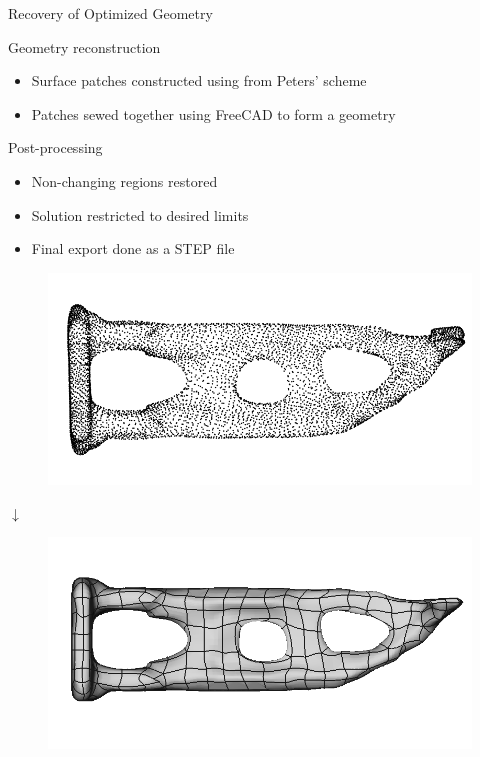 \begin{frame}{Recovery of Optimized Geometry}
	\begin{minipage}[t]{0.5\linewidth}
		\begin{block}{Geometry reconstruction}
			\begin{itemize}
				\item Surface patches constructed using from Peters' scheme \\
				\item Patches sewed together using FreeCAD to form a geometry \\
			\end{itemize}
		\end{block}
		\begin{block}{Post-processing}
			\begin{itemize}
				\item Non-changing regions restored \\
				\item Solution restricted to desired limits \\
				\item Final export done as a STEP file
			\end{itemize}
		\end{block}
	\end{minipage}
	\hfill
	\begin{minipage}[t]{0.45\linewidth}
		\vspace{-0.25cm}
		\begin{figure}
			\includegraphics[width=.88\textwidth]{Pictures/SecondHalf/Back2CAD1}
		\end{figure}
		\vspace{-0.75cm}
		\begin{center}
			$\downarrow$
		\end{center}
		\vspace{-0.6cm}
		\begin{figure}
			\includegraphics[width=.88\textwidth]{Pictures/SecondHalf/Back2CAD2}

\end{figure}
\end{minipage}
\end{frame}
